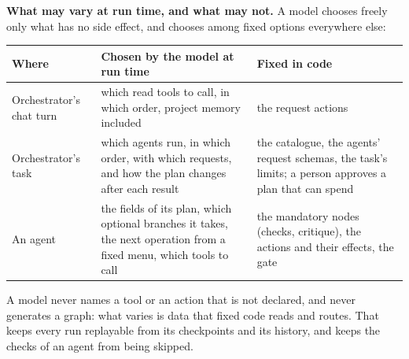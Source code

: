 \documentclass[11pt,a4paper]{article}
\begin{document}
\textbf{What may vary at run time, and what may not.} A model chooses freely only what has no side effect, and chooses among fixed options everywhere else:
\begin{longtable}{@{}>{\raggedright\arraybackslash}p{3.0cm}>{\raggedright\arraybackslash}p{6.4cm}>{\raggedright\arraybackslash}p{5.9cm}@{}}
\toprule
\textbf{Where} & \textbf{Chosen by the model at run time} & \textbf{Fixed in code}\\
\midrule
\endhead
Orchestrator's chat turn & which read tools to call, in which order, project memory included & the request actions\\
Orchestrator's task & which agents run, in which order, with which requests, and how the plan changes after each result & the catalogue, the agents' request schemas, the task's limits; a person approves a plan that can spend\\
An agent & the fields of its plan, which optional branches it takes, the next operation from a fixed menu, which tools to call & the mandatory nodes (checks, critique), the actions and their effects, the gate\\
\bottomrule
\end{longtable}
A model never names a tool or an action that is not declared, and never generates a graph: what varies is data that fixed code reads and routes. That keeps every run replayable from its checkpoints and its history, and keeps the checks of an agent from being skipped.
\end{document}
